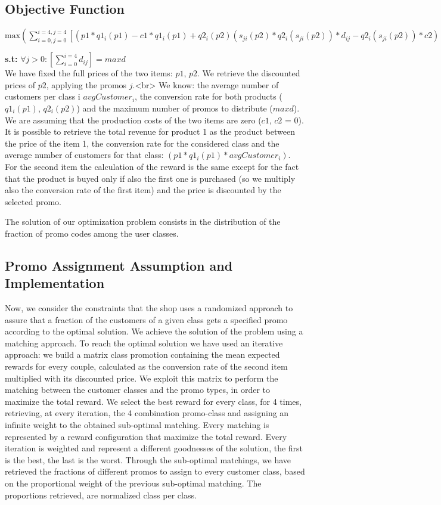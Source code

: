 \subsection{Objective Function}
$\textrm {max} ( \sum \limits _{i = 0, j = 0} ^{i = 4, j = 4}[(p1*q1_i(p1) - c1*q1_i(p1) + q2_i(p2)(s_{ji}(p2)*q2_i(s_{ji}(p2))*d_{ij} -  q2_i(s_{ji}(p2))*c2))*avgCustomer_i])$

\textbf{s.t:} $ \forall j>0 : [\sum \limits _{i = 0} ^{i = 4} d_{ij}] = maxd $
\\
We have fixed the full prices of the two items: $p1$, $p2$. We retrieve the discounted prices of $p2$, applying the promos $j$.<br>
We know: the average number of customers per class i $avgCustomer_i$, the conversion rate for both products ($q1_i(p1)$, $q2_i(p2)$) and the maximum number of promos to distribute ($maxd$).
We are assuming that the production costs of the two items are zero ($c1$, $c2$ = 0). 
It is possible to retrieve the total revenue for product 1 as the product between the price of the item 1, the conversion rate for the considered class and the average number of customers for that class:
$(p1 * q1_i(p1) * avgCustomer_i)$. For the second item the calculation of the reward is the same except for the fact that the product is buyed only if also the first one is purchased (so we multiply also the conversion rate of the first item) and the price is discounted by the selected promo. 

The solution of our optimization problem consists in the distribution of the fraction of promo codes among the user classes.

\subsection{Promo Assignment Assumption and Implementation}

Now, we consider the constraints that the shop uses a randomized approach to assure that a fraction of the customers of a given class gets a specified promo according to the optimal solution.
We achieve the solution of the problem using a matching approach. 
To reach the optimal solution we have used an iterative approach: we build a matrix class promotion containing the mean expected rewards for every couple, calculated as the conversion rate of the second item multiplied with its discounted price.
We exploit this matrix to perform the matching between the customer classes and the promo types, in order to maximize the total reward. 
We select the best reward for every class, for 4 times, retrieving, at every iteration, the 4 combination promo-class and assigning an infinite weight to the obtained sub-optimal matching.
Every matching is represented by a reward configuration that maximize the total reward. Every iteration is weighted and represent a different goodnesses of the solution, the first is the best, the last is the worst.
Through the sub-optimal matchings, we have retrieved the fractions of different promos to assign to every customer class, based on the proportional weight of the previous sub-optimal matching.
The proportions retrieved, are normalized class per class.



